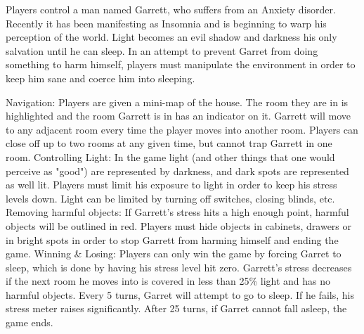 \documentclass[archE1,portrait]{baposter}
\begin{document}
\begin{poster}
{
	\quad Players control a man named Garrett, who suffers from an Anxiety disorder. Recently it has been manifesting as Insomnia and is beginning to warp his perception of the world. Light becomes an evil shadow and darkness his only salvation until he can sleep. In an attempt to prevent Garret from doing something to harm himself, players must manipulate the environment in order to keep him sane and coerce him into sleeping. 
}


{
	\begin{outline}
		\1 Navigation:
			\2 Players are given a mini-map of the house. The room they are in is highlighted and the room Garrett is in has an indicator on it.
			\2 Garrett will move  to any adjacent room every time the player moves into another room.
			\2 Players can close off up to two rooms at any given time, but cannot trap Garrett in one room.
		\1 Controlling Light:
			\2 In the game light (and other things that one would perceive as "good") are represented by darkness, and dark spots are represented as well lit.
			\2 Players must limit his exposure to light in order to keep his stress levels down.
			\2 Light can be limited by turning off switches, closing blinds, etc.
		\1 Removing harmful objects:
			\2 If Garrett's stress hits a high enough point, harmful objects will be outlined in red.
			\2 Players must hide objects in cabinets, drawers or in bright spots in order to stop Garrett from harming himself and ending the game.
		\1 Winning \& Losing:
			\2 Players can only win the game by forcing Garret to sleep, which is done by having his stress level hit zero.
			\2 Garrett's stress decreases if the next room he moves into is covered in less than 25\% light and has no harmful objects. 
			\2 Every 5 turns, Garret will attempt to go to sleep. If he fails, his stress meter raises significantly. After 25 turns, if Garret cannot fall asleep, the game ends.
	\end{outline}
}

\end{poster}
\end{document}
